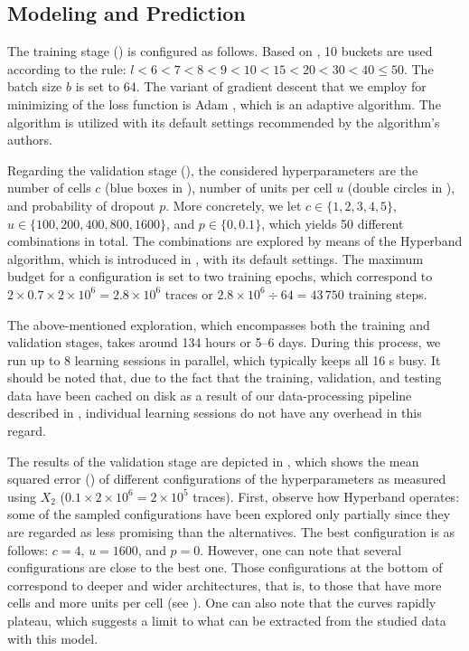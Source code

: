 \subsection{Modeling and Prediction}
The training stage () is configured as follows. Based on
, 10 buckets are used according to the rule: $l < 6 < 7 < 8 < 9 <
10 < 15 < 20 < 30 < 40 \leq 50$. The batch size $b$ is set to 64. The variant of
gradient descent that we employ for minimizing of the loss function is Adam
\cite{kingma2014}, which is an adaptive algorithm. The algorithm is utilized
with its default settings recommended by the algorithm's authors.

Regarding the validation stage (), the considered
hyperparameters are the number of cells $c$ (blue boxes in ), number
of units per cell $u$ (double circles in ), and probability of
dropout $p$. More concretely, we let $c \in \{1, 2, 3, 4, 5\}$, $u \in \{100,
200, 400, 800, 1600\}$, and $p \in \{0, 0.1\}$, which yields 50 different
combinations in total. The combinations are explored by means of the Hyperband
algorithm, which is introduced in , with its default settings.
The maximum budget for a configuration is set to two training epochs, which
correspond to $2 \times 0.7 \times 2 \times 10^6 = 2.8 \times 10^6$ traces or
$2.8 \times 10^6 \div 64 = 43\,750$ training steps.

The above-mentioned exploration, which encompasses both the training and
validation stages, takes around 134 hours or 5--6 days. During this process, we
run up to 8 learning sessions in parallel, which typically keeps all 16
s busy. It should be noted that, due to the fact that the training,
validation, and testing data have been cached on disk as a result of our
data-processing pipeline described in , individual learning sessions
do not have any overhead in this regard.


The results of the validation stage are depicted in , which
shows the mean squared error () of different configurations of the
hyperparameters as measured using $X_2$ ($0.1 \times 2 \times 10^6 = 2 \times
10^5$ traces). First, observe how Hyperband operates: some of the sampled
configurations have been explored only partially since they are regarded as less
promising than the alternatives. The best configuration is as follows: $c = 4$,
$u = 1600$, and $p = 0$. However, one can note that several configurations are
close to the best one. Those configurations at the bottom of 
correspond to deeper and wider architectures, that is, to those that have more
cells and more units per cell (see ). One can also note that the
curves rapidly plateau, which suggests a limit to what can be extracted from the
studied data with this model.

